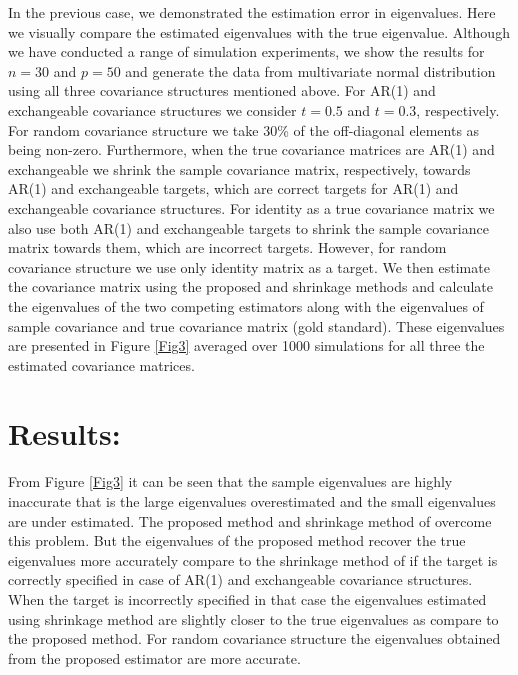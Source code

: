 In the previous case, we demonstrated the estimation error in eigenvalues. Here we visually compare the estimated eigenvalues with the true eigenvalue. Although we have conducted a range of simulation experiments, we show the results for $n=30$ and $p=50$ and generate the data from multivariate normal distribution using all three covariance structures mentioned above. For AR(1) and exchangeable covariance structures we consider $t=0.5$ and $t=0.3$, respectively. For random covariance structure we take 30\% of the off-diagonal elements as being non-zero. Furthermore, when the true covariance matrices are AR(1) and exchangeable we shrink the sample covariance matrix, respectively, towards AR(1) and exchangeable targets, which are correct targets for AR(1) and exchangeable covariance structures. For identity as a true covariance matrix we also use both AR(1) and exchangeable targets to shrink the sample covariance matrix towards them, which are incorrect targets. However, for random covariance structure we use only identity matrix as a target. We then estimate the covariance matrix using the proposed and shrinkage methods and calculate the eigenvalues of the two competing estimators along with the eigenvalues of sample covariance and true covariance matrix (gold standard). These eigenvalues are presented in Figure \ref{Fig3} averaged over 1000 simulations for all three the estimated covariance matrices. 
\section*{Results:}
From Figure \ref{Fig3} it can be seen that the sample eigenvalues are highly inaccurate that is the large eigenvalues overestimated and the small eigenvalues are under estimated. The proposed method and shrinkage method of \cite{schafer2005shrinkage} overcome this problem. But the eigenvalues of the proposed method recover the true eigenvalues more accurately compare to the shrinkage method of \cite{schafer2005shrinkage} if the target is correctly specified in case of AR(1) and exchangeable covariance structures. When the target is incorrectly specified in that case the eigenvalues estimated using shrinkage method are slightly closer to the true eigenvalues as compare to the proposed method. For random covariance structure the eigenvalues obtained from the proposed estimator are more accurate. 

